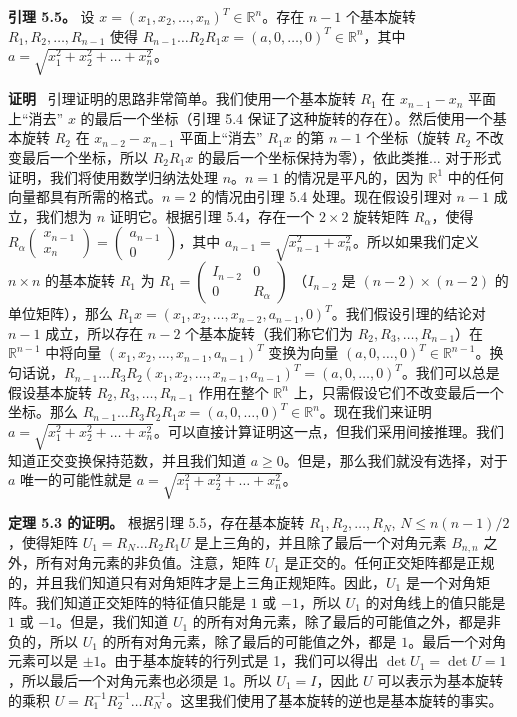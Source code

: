 \textbf{引理 5.5。} 设 $x = (x_1, x_2, \dots, x_n)^T \in \mathbb{R}^n$。存在 $n-1$ 个基本旋转 $R_1, R_2, \dots, R_{n-1}$ 使得 $R_{n-1} \dots R_2 R_1 x = (a, 0, \dots, 0)^T \in \mathbb{R}^n$，其中 $a = \sqrt{x_1^2 + x_2^2 + \dots + x_n^2}$。

\textbf{证明}~ 引理证明的思路非常简单。我们使用一个基本旋转 $R_1$ 在 $x_{n-1} - x_n$ 平面上“消去” $x$ 的最后一个坐标（引理 5.4 保证了这种旋转的存在）。然后使用一个基本旋转 $R_2$ 在 $x_{n-2} - x_{n-1}$ 平面上“消去” $R_1 x$ 的第 $n-1$ 个坐标（旋转 $R_2$ 不改变最后一个坐标，所以 $R_2 R_1 x$ 的最后一个坐标保持为零），依此类推... 对于形式证明，我们将使用数学归纳法处理 $n$。$n=1$ 的情况是平凡的，因为 $\mathbb{R}^1$ 中的任何向量都具有所需的格式。$n=2$ 的情况由引理 5.4 处理。现在假设引理对 $n-1$ 成立，我们想为 $n$ 证明它。根据引理 5.4，存在一个 $2 \times 2$ 旋转矩阵 $R_\alpha$，使得 $R_\alpha \begin{pmatrix} x_{n-1} \\ x_n \end{pmatrix} = \begin{pmatrix} a_{n-1} \\ 0 \end{pmatrix}$，其中 $a_{n-1} = \sqrt{x_{n-1}^2 + x_n^2}$。所以如果我们定义 $n \times n$ 的基本旋转 $R_1$ 为 $R_1 = \begin{pmatrix} I_{n-2} & 0 \\ 0 & R_\alpha \end{pmatrix}$ （$I_{n-2}$ 是 $(n-2) \times (n-2)$ 的单位矩阵），那么 $R_1 x = (x_1, x_2, \dots, x_{n-2}, a_{n-1}, 0)^T$。我们假设引理的结论对 $n-1$ 成立，所以存在 $n-2$ 个基本旋转（我们称它们为 $R_2, R_3, \dots, R_{n-1}$）在 $\mathbb{R}^{n-1}$ 中将向量 $(x_1, x_2, \dots, x_{n-1}, a_{n-1})^T$ 变换为向量 $(a, 0, \dots, 0)^T \in \mathbb{R}^{n-1}$。换句话说，$R_{n-1} \dots R_3 R_2 (x_1, x_2, \dots, x_{n-1}, a_{n-1})^T = (a, 0, \dots, 0)^T$。我们可以总是假设基本旋转 $R_2, R_3, \dots, R_{n-1}$ 作用在整个 $\mathbb{R}^n$ 上，只需假设它们不改变最后一个坐标。那么 $R_{n-1} \dots R_3 R_2 R_1 x = (a, 0, \dots, 0)^T \in \mathbb{R}^n$。现在我们来证明 $a = \sqrt{x_1^2 + x_2^2 + \dots + x_n^2}$。可以直接计算证明这一点，但我们采用间接推理。我们知道正交变换保持范数，并且我们知道 $a \geq 0$。但是，那么我们就没有选择，对于 $a$ 唯一的可能性就是 $a = \sqrt{x_1^2 + x_2^2 + \dots + x_n^2}$。

\textbf{定理 5.3 的证明。} 根据引理 5.5，存在基本旋转 $R_1, R_2, \dots, R_N$, $N \leq n(n-1)/2$，使得矩阵 $U_1 = R_N \dots R_2 R_1 U$ 是上三角的，并且除了最后一个对角元素 $B_{n,n}$ 之外，所有对角元素的非负值。注意，矩阵 $U_1$ 是正交的。任何正交矩阵都是正规的，并且我们知道只有对角矩阵才是上三角正规矩阵。因此，$U_1$ 是一个对角矩阵。我们知道正交矩阵的特征值只能是 $1$ 或 $-1$，所以 $U_1$ 的对角线上的值只能是 $1$ 或 $-1$。但是，我们知道 $U_1$ 的所有对角元素，除了最后的可能值之外，都是非负的，所以 $U_1$ 的所有对角元素，除了最后的可能值之外，都是 $1$。最后一个对角元素可以是 $\pm 1$。由于基本旋转的行列式是 1，我们可以得出 $\det U_1 = \det U = 1$，所以最后一个对角元素也必须是 1。所以 $U_1 = I$，因此 $U$ 可以表示为基本旋转的乘积 $U = R_1^{-1} R_2^{-1} \dots R_N^{-1}$。这里我们使用了基本旋转的逆也是基本旋转的事实。

